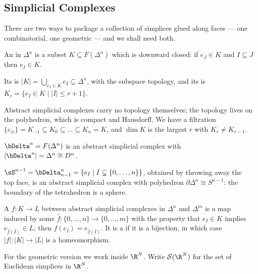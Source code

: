 \subsection{Simplicial Complexes}

There are two ways to package a collection of simplices glued along faces --- one
combinatorial, one geometric --- and we shall need both.

\begin{definition}
	An  in $\Delta^n$ is a subset $K \subseteq F(\Delta^n)$ which is downward closed: if $e_J \in K$ and $I \subseteq J$ then $e_I \in K$.

	Its  is $|K| = \bigcup_{e_I \in K} e_I \subseteq \Delta^n$, with the subspace topology, and its  is $K_r = \{e_I \in K \mid |I| \leq r+1\}$.
\end{definition}

Abstract simplicial complexes carry no topology themselves; the topology lives on the
polyhedron, which is compact and Hausdorff. We have a filtration
$\{e_\varnothing\} = K_{-1} \subseteq K_0 \subseteq \dots \subseteq K_n = K$, and
$\dim K$ is the largest $r$ with $K_r \neq K_{r-1}$.

\begin{example} \label{ex:bdelta}
	$\bDelta^n = F(\Delta^n)$ is an abstract simplicial complex with $|\bDelta^n| = \Delta^n \cong D^n$.
\end{example}

\begin{example} \label{ex:ssphere}
	$\sS^{n-1} = \bDelta^n_{n-1} = \{e_I \mid I \subsetneq \{0,\dots,n\}\}$, obtained by throwing away the top face, is an abstract simplicial complex with polyhedron $\partial \Delta^n \cong S^{n-1}$: the boundary of the tetrahedron is a sphere.
\end{example}

\begin{definition}
	A  $f: K \to L$ between abstract simplicial complexes in $\Delta^n$ and $\Delta^m$ is a map induced by some $\hat f: \{0,\dots,n\}\to\{0,\dots,m\}$ with the property that $e_I \in K$ implies $e_{\hat f(I)} \in L$; then $f(e_I) = e_{\hat f(I)}$. It is a  if it is a bijection, in which case $|f|: |K|\to|L|$ is a homeomorphism.
\end{definition}

For the geometric version we work inside $\R^N$. Write $\mathcal{S}(\R^N)$ for the set of
Euclidean simplices in $\R^N$.

